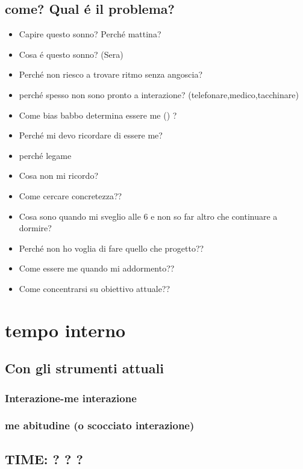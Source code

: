\section{come? Qual \'e il problema?}

\begin{itemize}
\item Capire questo sonno? Perch\'e mattina?
\item Cosa \'e questo sonno? (Sera)
\item Perch\'e non riesco a trovare ritmo senza angoscia?
\item perch\'e spesso non sono pronto a interazione? (telefonare,medico,tacchinare)
\item Come bias babbo determina essere me () ?
\item Perch\'e mi devo ricordare di essere me?
\item perch\'e legame 
\item Cosa non mi ricordo?
\item Come cercare concretezza??
\item Cosa sono quando mi sveglio alle 6 e non so far altro che continuare a dormire?
\item Perch\'e non ho voglia di fare quello che progetto??
\item Come essere me quando mi addormento??
\item Come concentrarsi su obiettivo attuale??
\end{itemize}

{\let\clearpage\relax
\chapter{tempo interno}
}
\PartialToc

\section{Con gli strumenti attuali}

\subsection{Interazione-me interazione}

\subsection{me abitudine (o scocciato interazione)}

\section{TIME: ? ? ?}

